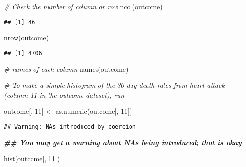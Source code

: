 \documentclass[
]{article}
\newenvironment{Shaded}{\begin{snugshade}}{\end{snugshade}}
\newcommand{\CommentTok}[1]{\textcolor[rgb]{0.56,0.35,0.01}{\textit{#1}}}
\newcommand{\DecValTok}[1]{\textcolor[rgb]{0.00,0.00,0.81}{#1}}
\newcommand{\DocumentationTok}[1]{\textcolor[rgb]{0.56,0.35,0.01}{\textbf{\textit{#1}}}}
\newcommand{\FunctionTok}[1]{\textcolor[rgb]{0.00,0.00,0.00}{#1}}
\newcommand{\NormalTok}[1]{#1}
\newcommand{\OtherTok}[1]{\textcolor[rgb]{0.56,0.35,0.01}{#1}}
\begin{document}
\begin{Shaded}
\begin{Highlighting}[]
\CommentTok{\# Check the number of column or row}
\FunctionTok{ncol}\NormalTok{(outcome)}
\end{Highlighting}
\end{Shaded}

\begin{verbatim}
## [1] 46
\end{verbatim}

\begin{Shaded}
\begin{Highlighting}[]
\FunctionTok{nrow}\NormalTok{(outcome)}
\end{Highlighting}
\end{Shaded}

\begin{verbatim}
## [1] 4706
\end{verbatim}

\begin{Shaded}
\begin{Highlighting}[]
\CommentTok{\# names of each column}
\FunctionTok{names}\NormalTok{(outcome)}
\end{Highlighting}
\end{Shaded}

\begin{Shaded}
\begin{Highlighting}[]
\CommentTok{\# To make a simple histogram of the 30{-}day death rates from heart attack (column 11 in the outcome dataset), run}

\NormalTok{outcome[, }\DecValTok{11}\NormalTok{] }\OtherTok{\textless{}{-}} \FunctionTok{as.numeric}\NormalTok{(outcome[, }\DecValTok{11}\NormalTok{])}
\end{Highlighting}
\end{Shaded}

\begin{verbatim}
## Warning: NAs introduced by coercion
\end{verbatim}

\begin{Shaded}
\begin{Highlighting}[]
\DocumentationTok{\#\# You may get a warning about NAs being introduced; that is okay}

\FunctionTok{hist}\NormalTok{(outcome[, }\DecValTok{11}\NormalTok{])}
\end{Highlighting}
\end{Shaded}
\end{document}
